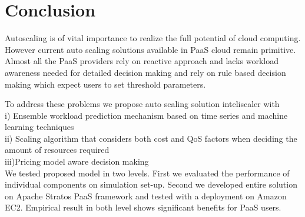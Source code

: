 \section{Conclusion}

Autoscaling is of vital importance to realize the full potential of cloud computing. However current auto scaling solutions available in PaaS cloud remain primitive. Almost all the PaaS providers rely on reactive approach and lacks workload awareness needed for detailed decision making and rely on rule based decision making which expect users to set threshold parameters. 

To address these problems we propose auto scaling solution inteliscaler with\\
i)  Ensemble workload prediction mechanism based on time series and machine learning techniques \\ 
ii) Scaling algorithm that considers both cost and QoS factors when deciding the amount of resources required\\
iii)Pricing model aware decision making\\

We tested proposed model in two levels. First we evaluated the performance of individual components on simulation set-up. Second we developed entire solution on Apache Stratos PaaS framework and tested with a deployment on Amazon EC2. Empirical result in both level shows significant benefits for PaaS users.




